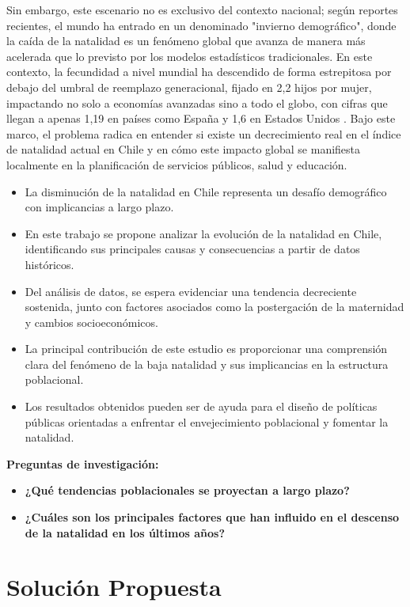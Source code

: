 \documentclass[runningheads]{llncs}
\begin{document}
Sin embargo, este escenario no es exclusivo del contexto nacional; según reportes recientes, el mundo ha entrado en un denominado "invierno demográfico", donde la caída de la natalidad es un fenómeno global que avanza de manera más acelerada que lo previsto por los modelos estadísticos tradicionales. En este contexto, la fecundidad a nivel mundial ha descendido de forma estrepitosa por debajo del umbral de reemplazo generacional, fijado en 2,2 hijos por mujer, impactando no solo a economías avanzadas sino a todo el globo, con cifras que llegan a apenas 1,19 en países como España y 1,6 en Estados Unidos \cite{infobae2025invierno}. Bajo este marco, el problema radica en entender si existe un decrecimiento real en el índice de natalidad actual en Chile y en cómo este impacto global se manifiesta localmente en la planificación de servicios públicos, salud y educación.

\begin{itemize}
    \item La disminución de la natalidad en Chile representa un desafío demográfico con implicancias a largo plazo.
    \item En este trabajo se propone analizar la evolución de la natalidad en Chile, identificando sus principales causas y consecuencias a partir de datos históricos.
    \item Del análisis de datos, se espera evidenciar una tendencia decreciente sostenida, junto con factores asociados como la postergación de la maternidad y cambios socioeconómicos.
    \item La principal contribución de este estudio es proporcionar una comprensión clara del fenómeno de la baja natalidad y sus implicancias en la estructura poblacional.
    \item Los resultados obtenidos pueden ser de ayuda para el diseño de políticas públicas orientadas a enfrentar el envejecimiento poblacional y fomentar la natalidad.
\end{itemize}

\textbf{Preguntas de investigación:}
\begin{itemize}
\item \textbf{¿Qué tendencias poblacionales se proyectan a largo plazo?}
\item \textbf{¿Cuáles son los principales factores que han influido en el descenso de la natalidad en los últimos años?}
\end{itemize}

\section{Solución Propuesta}
\end{document}
